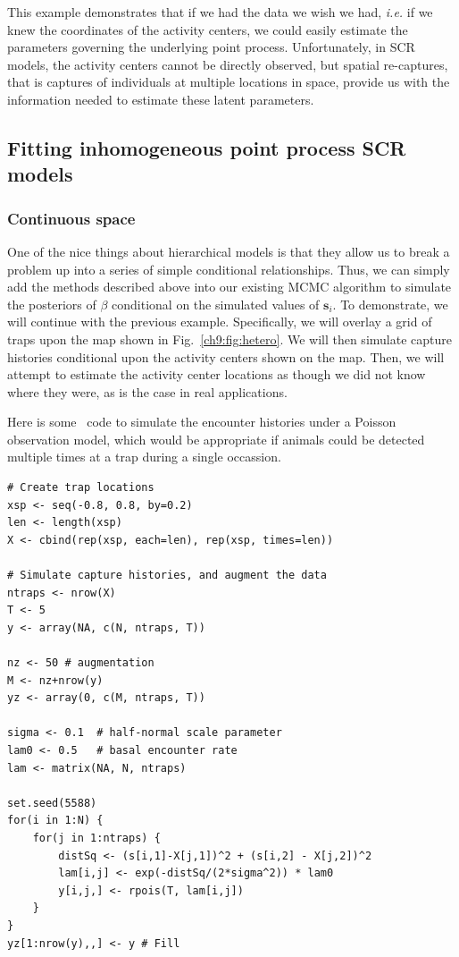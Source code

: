 This example demonstrates
that if we had the data we wish we had, {\it i.e.} if we knew the
coordinates of the activity centers, we could easily estimate the
parameters governing the underlying point process. Unfortunately, in
SCR models, the activity centers cannot be directly observed, but
spatial re-captures, that is captures of individuals at
multiple locations in space, provide us with the information needed to
estimate these latent parameters.

\subsection{Fitting inhomogeneous point process SCR models}

\subsubsection{Continuous space}

One of the nice things about hierarchical models is that they allow us
to break a problem up into a series of simple conditional
relationships. Thus,
we can simply add the methods described above into our existing MCMC
algorithm to simulate the posteriors of $\beta$ conditional on the
simulated values of $\mathbf{s}_i$. To demonstrate, we will continue with
the previous example. Specifically, we will overlay a grid of
traps upon the map shown in Fig.~\ref{ch9:fig:hetero}. We will then
simulate capture histories conditional upon the activity centers shown
on the map. Then, we will attempt to estimate the activity center
locations as though we did not know where they were, as is the case in
real applications.

Here is some \R~code to simulate the encounter histories under a
Poisson observation model, which would be appropriate if animals could
be detected multiple times at a trap during a single occassion.

\begin{small}
\begin{verbatim}
# Create trap locations
xsp <- seq(-0.8, 0.8, by=0.2)
len <- length(xsp)
X <- cbind(rep(xsp, each=len), rep(xsp, times=len))

# Simulate capture histories, and augment the data
ntraps <- nrow(X)
T <- 5
y <- array(NA, c(N, ntraps, T))

nz <- 50 # augmentation
M <- nz+nrow(y)
yz <- array(0, c(M, ntraps, T))

sigma <- 0.1  # half-normal scale parameter
lam0 <- 0.5   # basal encounter rate
lam <- matrix(NA, N, ntraps)

set.seed(5588)
for(i in 1:N) {
    for(j in 1:ntraps) {
        distSq <- (s[i,1]-X[j,1])^2 + (s[i,2] - X[j,2])^2
        lam[i,j] <- exp(-distSq/(2*sigma^2)) * lam0
        y[i,j,] <- rpois(T, lam[i,j])
    }
}
yz[1:nrow(y),,] <- y # Fill
\end{verbatim}
\end{small}

